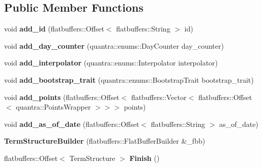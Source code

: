 \subsection*{Public Member Functions}
\begin{DoxyCompactItemize}
\item 
\mbox{\label{structquantra_1_1TermStructureBuilder_a57480794f34ddb130fa98c700d38beca}} 
void {\bfseries add\+\_\+id} (flatbuffers\+::\+Offset$<$ flatbuffers\+::\+String $>$ id)
\item 
\mbox{\label{structquantra_1_1TermStructureBuilder_a9169e1ee3b0e7bd51989bf0ecb838969}} 
void {\bfseries add\+\_\+day\+\_\+counter} (quantra\+::enums\+::\+Day\+Counter day\+\_\+counter)
\item 
\mbox{\label{structquantra_1_1TermStructureBuilder_a1076207b306055ff4d409a09edd0ad58}} 
void {\bfseries add\+\_\+interpolator} (quantra\+::enums\+::\+Interpolator interpolator)
\item 
\mbox{\label{structquantra_1_1TermStructureBuilder_a6643df7436409b7a677e7bcb23d53d5d}} 
void {\bfseries add\+\_\+bootstrap\+\_\+trait} (quantra\+::enums\+::\+Bootstrap\+Trait bootstrap\+\_\+trait)
\item 
\mbox{\label{structquantra_1_1TermStructureBuilder_a1a0d49be20840853b2c8f97a5649421e}} 
void {\bfseries add\+\_\+points} (flatbuffers\+::\+Offset$<$ flatbuffers\+::\+Vector$<$ flatbuffers\+::\+Offset$<$ quantra\+::\+Points\+Wrapper $>$$>$$>$ points)
\item 
\mbox{\label{structquantra_1_1TermStructureBuilder_abf2b9844c75abb8c916991ca25e29f45}} 
void {\bfseries add\+\_\+as\+\_\+of\+\_\+date} (flatbuffers\+::\+Offset$<$ flatbuffers\+::\+String $>$ as\+\_\+of\+\_\+date)
\item 
\mbox{\label{structquantra_1_1TermStructureBuilder_afbdc0052758e40abac4afcade6b1fe7a}} 
{\bfseries Term\+Structure\+Builder} (flatbuffers\+::\+Flat\+Buffer\+Builder \&\+\_\+fbb)
\item 
\mbox{\label{structquantra_1_1TermStructureBuilder_ad2e483dd423b360bd3c23c3269184e74}} 
flatbuffers\+::\+Offset$<$ Term\+Structure $>$ {\bfseries Finish} ()
\end{DoxyCompactItemize}
